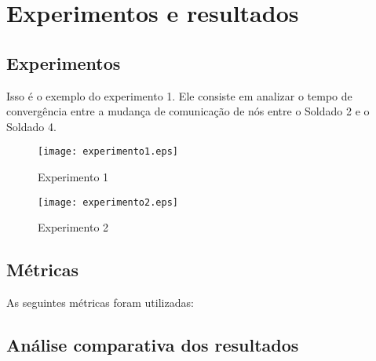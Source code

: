 \section{Experimentos e resultados}


\subsection{Experimentos}
Isso \'e o exemplo do experimento 1.
Ele consiste em analizar o tempo de converg\^encia entre a mudan\c{c}a de comunica\c{c}\~ao de n\'os entre o Soldado 2 e o Soldado 4.
\begin{figure}[htb]
	\centering
	\texttt{[image: experimento1.eps]}
	\caption{Experimento 1}
	\label{figExp1}
\end{figure}

\begin{figure}[htb]
	\centering
	\texttt{[image: experimento2.eps]}
	\caption{Experimento 2}
	\label{figExp2}
\end{figure}


\subsection{M\'etricas}
As seguintes m\'etricas foram utilizadas:


\subsection{An\'alise comparativa dos resultados}


